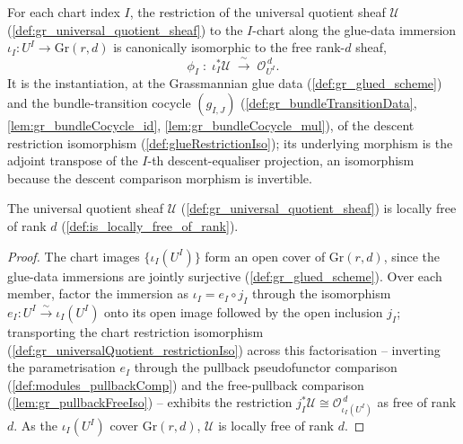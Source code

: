 \begin{definition}
  \label{def:gr_universalQuotient_restrictionIso}
  For each chart index \(I\), the restriction of the universal quotient sheaf
  \(\mathcal{U}\) (\cref{def:gr_universal_quotient_sheaf}) to the \(I\)-chart along the
  glue-data immersion \(\iota_I : U^I \to \mathrm{Gr}(r,d)\) is canonically isomorphic to
  the free rank-\(d\) sheaf,
  \[
    \phi_I \;:\; \iota_I^{*}\mathcal{U}
      \;\xrightarrow{\ \sim\ }\; \mathcal{O}_{U^I}^{\,d}.
  \]
  It is the instantiation, at the Grassmannian glue data (\cref{def:gr_glued_scheme}) and
  the bundle-transition cocycle \((g_{I,J})\) (\cref{def:gr_bundleTransitionData},
  \cref{lem:gr_bundleCocycle_id}, \cref{lem:gr_bundleCocycle_mul}), of the descent
  restriction isomorphism (\cref{def:glueRestrictionIso}); its underlying morphism is the
  adjoint transpose of the \(I\)-th descent-equaliser projection, an isomorphism because
  the descent comparison morphism is invertible.
\end{definition}

\begin{lemma}
  \label{lem:gr_universalQuotient_isLocallyFreeOfRank}
  The universal quotient sheaf \(\mathcal{U}\) (\cref{def:gr_universal_quotient_sheaf}) is
  locally free of rank \(d\) (\cref{def:is_locally_free_of_rank}).
\end{lemma}
\begin{proof}
  The chart images \(\{\iota_I(U^I)\}\) form an open cover of \(\mathrm{Gr}(r,d)\), since
  the glue-data immersions are jointly surjective (\cref{def:gr_glued_scheme}). Over each
  member, factor the immersion as \(\iota_I = e_I \circ j_I\) through the isomorphism
  \(e_I : U^I \xrightarrow{\sim} \iota_I(U^I)\) onto its open image followed by the open
  inclusion \(j_I\); transporting the chart restriction isomorphism
  (\cref{def:gr_universalQuotient_restrictionIso}) across this factorisation -- inverting
  the parametrisation \(e_I\) through the pullback pseudofunctor comparison
  (\cref{def:modules_pullbackComp}) and the free-pullback comparison
  (\cref{lem:gr_pullbackFreeIso}) -- exhibits the restriction
  \(j_I^{*}\mathcal{U} \cong \mathcal{O}_{\iota_I(U^I)}^{\,d}\) as free of rank \(d\). As
  the \(\iota_I(U^I)\) cover \(\mathrm{Gr}(r,d)\), \(\mathcal{U}\) is locally free of
  rank \(d\).
\end{proof}

